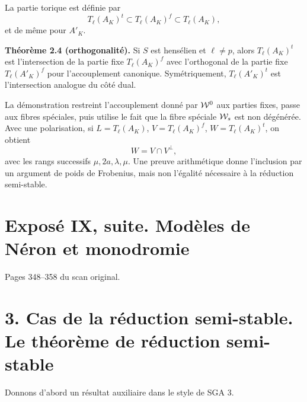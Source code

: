 \documentclass[11pt]{article}
\providecommand{\Hom}{\operatorname{Hom}}
\begin{document}
La partie torique est d\'efinie par
\begin{equation}\tag{2.3.4}
 T_\ell(A_K)^t\subset T_\ell(A_K)^f\subset T_\ell(A_K),
\end{equation}
et de m\^eme pour \(A'_K\).

\textbf{Th\'eor\`eme 2.4 (orthogonalit\'e).}  Si \(S\) est hens\'elien et \(\ell\ne p\), alors \(T_\ell(A_K)^t\) est l'intersection de la partie fixe \(T_\ell(A_K)^f\) avec l'orthogonal de la partie fixe \(T_\ell(A'_K)^f\) pour l'accouplement canonique.  Sym\'etriquement, \(T_\ell(A'_K)^t\) est l'intersection analogue du c\^ot\'e dual.

La d\'emonstration restreint l'accouplement donn\'e par \(\mathcal W^0\) aux parties fixes, passe aux fibres sp\'eciales, puis utilise le fait que la fibre sp\'eciale \(\mathcal W_s\) est non d\'eg\'en\'er\'ee.  Avec une polarisation, si \(L=T_\ell(A_K)\), \(V=T_\ell(A_K)^f\), \(W=T_\ell(A_K)^t\), on obtient
\begin{equation}\tag{2.5.3}
 W=V\cap V^\perp,
\end{equation}
avec les rangs successifs \(\mu,2a,\lambda,\mu\).  Une preuve arithm\'etique donne l'inclusion par un argument de poids de Frobenius, mais non l'\'egalit\'e n\'ecessaire \`a la r\'eduction semi-stable.



\providecommand{\rang}{\operatorname{rang}}
\providecommand{\rankmult}{\operatorname{rank}_{\mathrm{mult}}}
\providecommand{\Hom}{\operatorname{Hom}}
\providecommand{\End}{\operatorname{End}}
\providecommand{\Swan}{\operatorname{Swan}}
\providecommand{\cond}{\operatorname{cond}}
\providecommand{\coker}{\operatorname{coker}}
\providecommand{\Lie}{\operatorname{Lie}}
\providecommand{\Tr}{\operatorname{Tr}}

\section*{Exposé IX, suite. Modèles de Néron et monodromie}
\begin{center}
Pages 348--358 du scan original.
\end{center}

\section*{3. Cas de la réduction semi-stable. Le théorème de réduction semi-stable}

Donnons d'abord un résultat auxiliaire dans le style de SGA 3.
\end{document}
